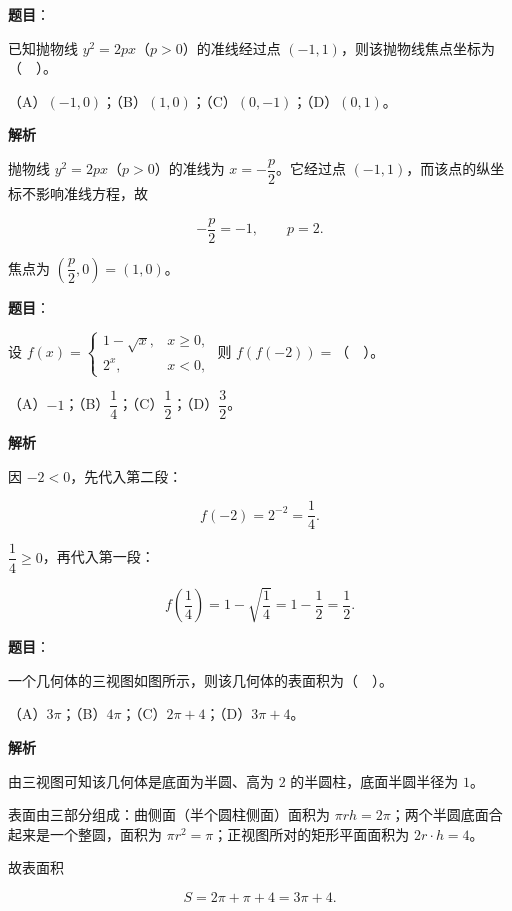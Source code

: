 \begin{answer}

\textbf{题目}：

已知抛物线 $y^{2}=2px$（$p>0$）的准线经过点 $(-1,1)$，则该抛物线焦点坐标为（　）。

（A）$(-1,0)$；（B）$(1,0)$；（C）$(0,-1)$；（D）$(0,1)$。

\textbf{解析}

抛物线 $y^{2}=2px$（$p>0$）的准线为 $x=-\dfrac{p}{2}$。它经过点 $(-1,1)$，而该点的纵坐标不影响准线方程，故

\nopagebreak[4]
\[
-\frac{p}{2}=-1,\qquad p=2.
\]

焦点为 $\left(\dfrac{p}{2},0\right)=(1,0)$。


\end{answer}
\begin{answer}

\textbf{题目}：

设 $f(x)=\begin{cases}1-\sqrt{x}, & x\ge 0,\\[2pt] 2^{x}, & x<0,\end{cases}$ 则 $f(f(-2))=$（　）。

（A）$-1$；（B）$\dfrac{1}{4}$；（C）$\dfrac{1}{2}$；（D）$\dfrac{3}{2}$。

\textbf{解析}

因 $-2<0$，先代入第二段：

\nopagebreak[4]
\[
f(-2)=2^{-2}=\frac{1}{4}.
\]

$\dfrac{1}{4}\ge 0$，再代入第一段：

\nopagebreak[4]
\[
f\left(\frac{1}{4}\right)=1-\sqrt{\frac{1}{4}}=1-\frac{1}{2}=\frac{1}{2}.
\]


\end{answer}
\begin{answer}

\textbf{题目}：

一个几何体的三视图如图所示，则该几何体的表面积为（　）。
\nopagebreak[4]
\begin{center}\end{center}
\nopagebreak[4]
（A）$3\pi$；（B）$4\pi$；（C）$2\pi+4$；（D）$3\pi+4$。

\textbf{解析}

由三视图可知该几何体是底面为半圆、高为 $2$ 的半圆柱，底面半圆半径为 $1$。

表面由三部分组成：曲侧面（半个圆柱侧面）面积为 $\pi r h=2\pi$；两个半圆底面合起来是一个整圆，面积为 $\pi r^{2}=\pi$；正视图所对的矩形平面面积为 $2r\cdot h=4$。

故表面积

\nopagebreak[4]
\[
S=2\pi+\pi+4=3\pi+4.
\]


\end{answer}
